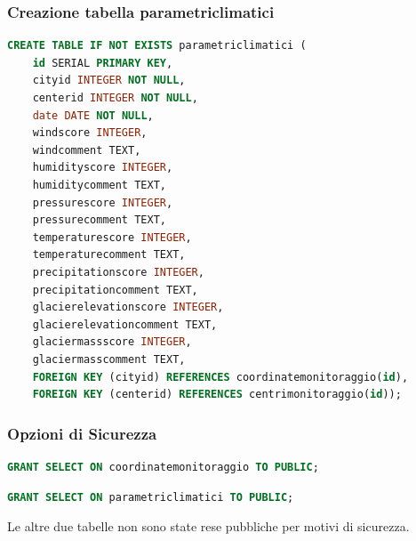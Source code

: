 \subsubsection{Creazione tabella parametriclimatici}
\begin{lstlisting}[language=SQL]
    CREATE TABLE IF NOT EXISTS parametriclimatici (
    id SERIAL PRIMARY KEY, 
    cityid INTEGER NOT NULL, 
    centerid INTEGER NOT NULL, 
    date DATE NOT NULL, 
    windscore INTEGER, 
    windcomment TEXT, 
    humidityscore INTEGER, 
    humiditycomment TEXT, 
    pressurescore INTEGER, 
    pressurecomment TEXT, 
    temperaturescore INTEGER, 
    temperaturecomment TEXT, 
    precipitationscore INTEGER, 
    precipitationcomment TEXT, 
    glacierelevationscore INTEGER, 
    glacierelevationcomment TEXT, 
    glaciermassscore INTEGER, 
    glaciermasscomment TEXT, 
    FOREIGN KEY (cityid) REFERENCES coordinatemonitoraggio(id), 
    FOREIGN KEY (centerid) REFERENCES centrimonitoraggio(id));
\end{lstlisting}

\subsubsection{Opzioni di Sicurezza}

\begin{lstlisting}[language=SQL]
    GRANT SELECT ON coordinatemonitoraggio TO PUBLIC;
\end{lstlisting}

\begin{lstlisting}[language=SQL]
    GRANT SELECT ON parametriclimatici TO PUBLIC;
\end{lstlisting}

Le altre due tabelle non sono state rese pubbliche per motivi di sicurezza.